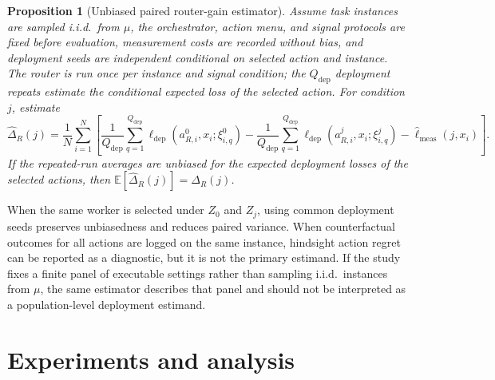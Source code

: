 \documentclass{article}
\newtheorem{proposition}{Proposition}
\newcommand{\E}{\mathbb{E}}
\begin{document}
\begin{proposition}[Unbiased paired router-gain estimator]
\label{prop:paired-unbiased}
Assume task instances are sampled i.i.d.\ from $\mu$, the orchestrator, action menu, and signal protocols are fixed before evaluation, measurement costs are recorded without bias, and deployment seeds are independent conditional on selected action and instance.
The router is run once per instance and signal condition; the $Q_{\mathrm{dep}}$ deployment repeats estimate the conditional expected loss of the selected action.
For condition $j$, estimate
\[
\widehat{\Delta}_R(j)
=
\frac{1}{N}\sum_{i=1}^N
\left[
\frac{1}{Q_{\mathrm{dep}}}\sum_{q=1}^{Q_{\mathrm{dep}}}
\ell_{\mathrm{dep}}(a_{R,i}^0,x_i;\xi_{i,q}^{0})
-
\frac{1}{Q_{\mathrm{dep}}}\sum_{q=1}^{Q_{\mathrm{dep}}}
\ell_{\mathrm{dep}}(a_{R,i}^j,x_i;\xi_{i,q}^{j})
-
\widehat{\ell}_{\mathrm{meas}}(j,x_i)
\right].
\]
If the repeated-run averages are unbiased for the expected deployment losses of the selected actions, then
$\E[\widehat{\Delta}_R(j)]=\Delta_R(j)$.
\end{proposition}

When the same worker is selected under $Z_0$ and $Z_j$, using common deployment seeds preserves unbiasedness and reduces paired variance.
When counterfactual outcomes for all actions are logged on the same instance, hindsight action regret can be reported as a diagnostic, but it is not the primary estimand.
If the study fixes a finite panel of executable settings rather than sampling i.i.d.\ instances from $\mu$, the same estimator describes that panel and should not be interpreted as a population-level deployment estimand.


\section{Experiments and analysis}
\label{sec:experiments}
\end{document}
